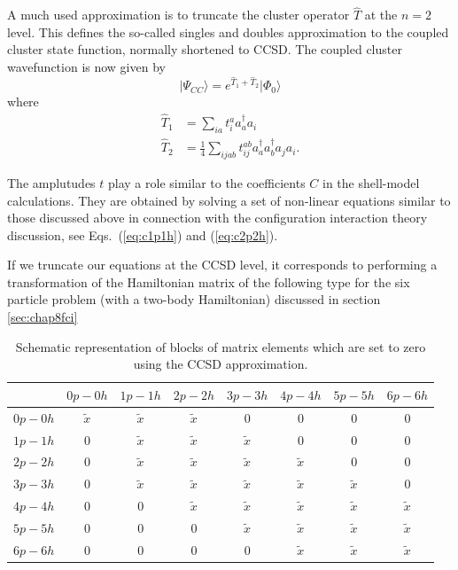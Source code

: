 A much used approximation is to truncate the cluster operator
$\hat{T}$ at the $n=2$ level. This defines the so-called singles and
doubles approximation to the coupled cluster state function, normally
shortened to CCSD.
The coupled cluster wavefunction is now given by
  \begin{equation}
              \vert \Psi_{CC}\rangle = e^{\hat{T}_1 + \hat{T}_2} \vert
              \Phi_0\rangle
  \end{equation}
  where
          \begin{align*}
              \hat{T}_1 &= \sum_{ia} t_{i}^{a} a_{a}^\dagger a_i
              \\ \hat{T}_2 &= \frac{1}{4} \sum_{ijab} t_{ij}^{ab}
              a_{a}^\dagger a_{b}^\dagger a_{j} a_{i}.
          \end{align*}

  The amplutudes $t$ play a role similar to the coefficients $C$ in
  the shell-model calculations. They are obtained by solving a set of
  non-linear equations similar to those discussed above in connection
  with the configuration interaction theory  discussion, see Eqs.~(\ref{eq:c1p1h}) and (\ref{eq:c2p2h}). 

  If we truncate our equations at the CCSD level, it corresponds to
  performing a transformation of the Hamiltonian matrix of the
  following type for the six particle problem (with a two-body
  Hamiltonian) discussed in section \ref{sec:chap8fci}
  \begin{table}
\caption{Schematic representation of blocks of matrix elements which are set to zero using the CCSD approximation.}
  \begin{center}
  \begin{tabular}{cccccccc}
  \hline \multicolumn{1}{c}{ } & \multicolumn{1}{c}{ $0p-0h$ } &
  \multicolumn{1}{c}{ $1p-1h$ } & \multicolumn{1}{c}{ $2p-2h$ } &
  \multicolumn{1}{c}{ $3p-3h$ } & \multicolumn{1}{c}{ $4p-4h$ } &
  \multicolumn{1}{c}{ $5p-5h$ } & \multicolumn{1}{c}{ $6p-6h$ }
  \\ \hline $0p-0h$ & $\tilde{x}$ & $\tilde{x}$ & $\tilde{x}$ & 0 & 0
  & 0 & 0 \\ $1p-1h$ & 0 & $\tilde{x}$ & $\tilde{x}$ & $\tilde{x}$ & 0
  & 0 & 0 \\ $2p-2h$ & 0 & $\tilde{x}$ & $\tilde{x}$ & $\tilde{x}$ &
  $\tilde{x}$ & 0 & 0 \\ $3p-3h$ & 0 & $\tilde{x}$ & $\tilde{x}$ &
  $\tilde{x}$ & $\tilde{x}$ & $\tilde{x}$ & 0 \\ $4p-4h$ & 0 & 0 &
  $\tilde{x}$ & $\tilde{x}$ & $\tilde{x}$ & $\tilde{x}$ & $\tilde{x}$
  \\ $5p-5h$ & 0 & 0 & 0 & $\tilde{x}$ & $\tilde{x}$ & $\tilde{x}$ &
  $\tilde{x}$ \\ $6p-6h$ & 0 & 0 & 0 & 0 & $\tilde{x}$ & $\tilde{x}$ &
  $\tilde{x}$ \\ \hline
  \end{tabular}
  \end{center}
  \end{table}

